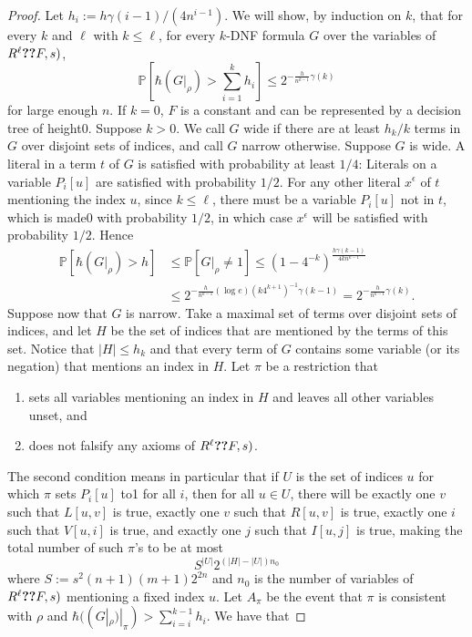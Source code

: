 \begin{proof}
Let $h_i:=h\gamma(i-1)/(4n^{i-1})$. We will show, by induction on $k$, that for every $k$ and $\ell$ with $k\le\ell$, for every $k$-DNF formula $G$ over the variables of $R^\ell\Ref(F,s)$,
\[\mathbb P\left[\hbar(G|_\rho)>\sum_{i=1}^kh_i\right]\le2^{-\frac h{n^{k-1}}\gamma(k)}\]
for large enough $n$.
If $k=0$, $F$ is a constant and can be represented by a decision tree of height0. Suppose $k>0$. We call $G$ wide if there are at least $h_k/k$ terms in $G$ over disjoint sets of indices, and call $G$ narrow otherwise. Suppose $G$ is wide. A literal in a term $t$ of $G$ is satisfied with probability at least $1/4$: Literals on a variable $P_i[u]$ are satisfied with probability $1/2$. For any other literal $x^\epsilon$ of $t$ mentioning the index $u$, since $k\le\ell$, there must be a variable $P_i[u]$ not in $t$, which is made0 with probability $1/2$, in which case $x^\epsilon$ will be satisfied with probability $1/2$. Hence
\begin{align*}
\mathbb P[\hbar(G|_\rho)>h]&\le\mathbb P[G|_\rho\ne1]\le(1-4^{-k})^{\frac{h\gamma(k-1)}{4kn^{k-1}}}\\
&\le2^{-\frac h{n^{k-1}}(\log e)(k4^{k+1})^{-1}\gamma(k-1)}=2^{-\frac h{n^{k-1}}\gamma(k)}.
\end{align*}
Suppose now that $G$ is narrow. Take a maximal set of terms over disjoint sets of indices, and let $H$ be the set of indices that are mentioned by the terms of this set. Notice that $|H|\le h_k$ and that every term of $G$ contains some variable (or its negation) that mentions an index in $H$. Let $\pi$ be a restriction that
\begin{enumerate}\item sets all variables mentioning an index in $H$ and leaves all other variables unset, and\item does not falsify any axioms of $R^\ell\Ref(F,s)$.\end{enumerate}
The second condition means in particular that if $U$ is the set of indices $u$ for which $\pi$ sets $P_i[u]$ to1 for all $i$, then for all $u\in U$, there will be exactly one $v$ such that $L[u,v]$ is true, exactly one $v$ such that $R[u,v]$ is true, exactly one $i$ such that $V[u,i]$ is true, and exactly one $j$ such that $I[u,j]$ is true, making the total number of such $\pi$'s to be at most
\[S^{|U|}2^{(|H|-|U|)n_0}\]
where $S:=s^2(n+1)(m+1)2^{2n}$ and $n_0$ is the number of variables of $R^\ell\Ref(F,s)$ mentioning a fixed index $u$.
Let $A_\pi$ be the event that $\pi$ is consistent with $\rho$ and $\hbar((G|_\rho)|_\pi)>\sum_{i=i}^{k-1}h_i$. We have that

\end{proof}
